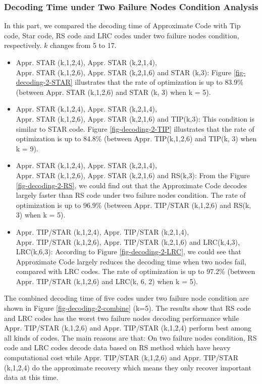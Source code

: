 \documentclass[sigconf]{acmart}
\begin{document}
\subsubsection{Decoding Time under Two Failure Nodes Condition Analysis}
In this part, we compared the decoding time of Approximate Code with Tip code, Star code, RS code and LRC codes under two failure nodes condition, respectively. $k$ changes from 5 to 17. 
\begin{itemize}
    \item Appr. STAR (k,1,2,4), Appr. STAR (k,2,1,4), \\
    Appr. STAR (k,1,2,6), Appr. STAR (k,2,1,6) and STAR (k,3): Figure \ref{fig-decoding-2-STAR} illustrates that the rate of optimization is up to 83.9\% (between Appr. STAR (k,1,2,6) and STAR (k, 3) when k = 5). 
    \item Appr. STAR (k,1,2,4), Appr. STAR (k,2,1,4),  \\ Appr. STAR (k,1,2,6), Appr. STAR (k,2,1,6) and TIP(k,3): This condition is similar to STAR code. Figure \ref{fig-decoding-2-TIP} illustrates that the rate of optimization is up to 84.8\% (between Appr. TIP(k,1,2,6) and TIP(k, 3) when k = 9).
    \item Appr. STAR (k,1,2,4), Appr. STAR (k,2,1,4),  \\ Appr. STAR (k,1,2,6), Appr. STAR (k,2,1,6) and RS(k,3): From the Figure \ref{fig-decoding-2-RS}, we could find out that the Approximate Code decodes largely faster than RS code under two failure nodes condition. The rate of optimization is up to 96.9\% (between Appr. TIP/STAR (k,1,2,6) and RS(k, 3) when k = 5).
    \item Appr. TIP/STAR (k,1,2,4), Appr. TIP/STAR (k,2,1,4),  \\ Appr. TIP/STAR (k,1,2,6), Appr. TIP/STAR (k,2,1,6) and LRC(k,4,3), LRC(k,6,3): 
    According to Figure \ref{fig-decoding-2-LRC}, we could see that Approximate Code largely reduces the decoding time when two nodes fail, compared with LRC codes. The rate of optimization is up to 97.2\% (between Appr. TIP/STAR (k,1,2,6) and LRC(k, 6, 2) when k = 5).
\end{itemize}

The combined decoding time of five codes under two failure node condition are shown in Figure \ref{fig-decoding-2-combine} (k=5). The results show that RS code and LRC codes has the worst two failure nodes decoding performance while Appr. TIP/STAR (k,1,2,6) and Appr. TIP/STAR (k,1,2,4) perform best among all kinds of codes. The main reasons are that: On two failure nodes condition, RS code and LRC codes decode data based on RS method which have heavy computational cost while Appr. TIP/STAR (k,1,2,6) and Appr. TIP/STAR (k,1,2,4) do the approximate recovery which means they only recover important data at this time.\par
\end{document}
